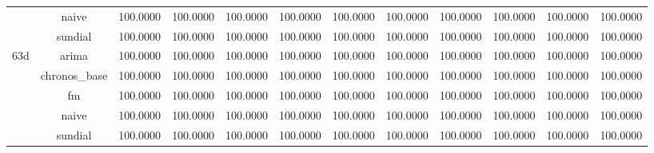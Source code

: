 \begin{table}[H]
{\begin{tabular}{cccccccccccc}
 & naive & 100.0000 & 100.0000 & 100.0000 & 100.0000 & 100.0000 & 100.0000 & 100.0000 & 100.0000 & 100.0000 & 100.0000 \\
 & sundial & 100.0000 & 100.0000 & 100.0000 & 100.0000 & 100.0000 & 100.0000 & 100.0000 & 100.0000 & 100.0000 & 100.0000 \\
\multirow[c]{5}{*}{63d} & arima & 100.0000 & 100.0000 & 100.0000 & 100.0000 & 100.0000 & 100.0000 & 100.0000 & 100.0000 & 100.0000 & 100.0000 \\
 & chronos_base & 100.0000 & 100.0000 & 100.0000 & 100.0000 & 100.0000 & 100.0000 & 100.0000 & 100.0000 & 100.0000 & 100.0000 \\
 & fm & 100.0000 & 100.0000 & 100.0000 & 100.0000 & 100.0000 & 100.0000 & 100.0000 & 100.0000 & 100.0000 & 100.0000 \\
 & naive & 100.0000 & 100.0000 & 100.0000 & 100.0000 & 100.0000 & 100.0000 & 100.0000 & 100.0000 & 100.0000 & 100.0000 \\
 & sundial & 100.0000 & 100.0000 & 100.0000 & 100.0000 & 100.0000 & 100.0000 & 100.0000 & 100.0000 & 100.0000 & 100.0000 \\
\bottomrule
\end{tabular}

 }
\end{table}